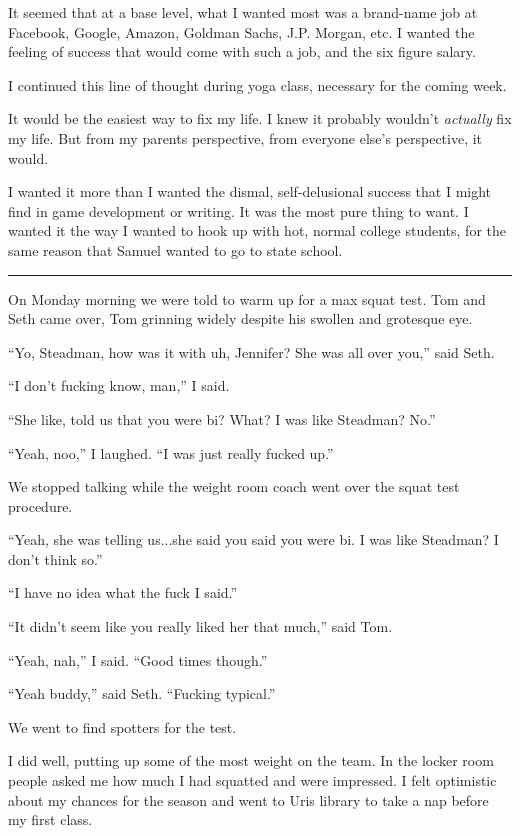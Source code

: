 It seemed that at a base level, what I wanted most was a brand-name job at
Facebook, Google, Amazon, Goldman Sachs, J.P.  Morgan, etc.  I wanted the
feeling of success that would come with such a job, and the six figure salary.

I continued this line of thought during yoga class, necessary for the coming
week.

It would be the easiest way to fix my life.  I knew it probably wouldn't
\textit{actually} fix my life.  But from my parents perspective, from everyone
else's perspective, it would.  

I wanted it more than I wanted the dismal, self-delusional success that I might
find in game development or writing.  It was the most pure thing to want. I
wanted it the way I wanted to hook up with hot, normal college students, for the
same reason that Samuel wanted to go to state school. 

\plainfancybreak{12pt}{2}{* * *}

On Monday morning we were told to warm up for a max squat test.  Tom and Seth
came over, Tom grinning widely despite his swollen and grotesque eye.

``Yo, Steadman, how was it with uh, Jennifer?  She was all over you,'' said
Seth.

``I don't fucking know, man,'' I said.

``She like, told us that you were bi?  What?  I was like Steadman?  No.''

``Yeah, noo,'' I laughed. ``I was just really fucked up.''

We stopped talking while the weight room coach went over the squat test
procedure. 

``Yeah, she was telling us...she said you said you were bi.  I was like
Steadman?  I don't think so.''

``I have no idea what the fuck I said.''

``It didn't seem like you really liked her that much,'' said Tom.

``Yeah, nah,'' I said.  ``Good times though.''

``Yeah buddy,'' said Seth.  ``Fucking typical.'' 

We went to find spotters for the test.

I did well, putting up some of the most weight on the team.  In the locker room
people asked me how much I had squatted and were impressed.  I felt optimistic
about my chances for the season and went to Uris library to take a nap before my
first class.

